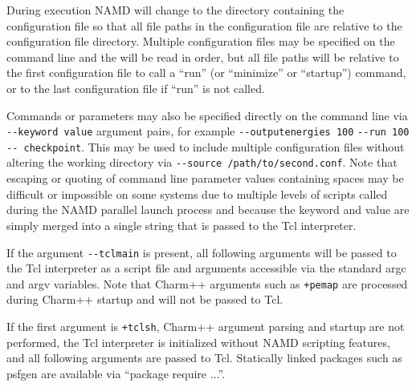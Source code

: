 During execution NAMD will change to the directory containing the
configuration file so that all file paths in the configuration file
are relative to the configuration file directory.
Multiple configuration files may be specified on the command line
and the will be read in order, but all file paths will be relative
to the first configuration file to call a ``run'' (or ``minimize'' or ``startup'') command, or
to the last configuration file if ``run'' is not called.

Commands or parameters may also be specified directly on the
command line via \verb#--keyword value# argument pairs, for example
\verb#--outputenergies 100# \verb#--run 100# \verb#-- checkpoint#.
This may be used to include multiple configuration files without altering the
working directory via \verb#--source /path/to/second.conf#.
Note that escaping or quoting of command line parameter values
containing spaces may be difficult or impossible on some systems due
to multiple levels of scripts called during the NAMD parallel launch process
and because the keyword and value are simply merged into a single string
that is passed to the Tcl interpreter.

If the argument \verb#--tclmain# is present, all following arguments will
be passed to the Tcl interpreter as a script file and arguments accessible
via the standard argc and argv variables.
Note that Charm++ arguments such as \verb#+pemap# are processed during
Charm++ startup and will not be passed to Tcl.

If the first argument is \verb#+tclsh#,
Charm++ argument parsing and startup are not performed,
the Tcl interpreter is initialized without NAMD scripting features,
and all following arguments are passed to Tcl.
Statically linked packages such as psfgen are available via ``package require ...''.

